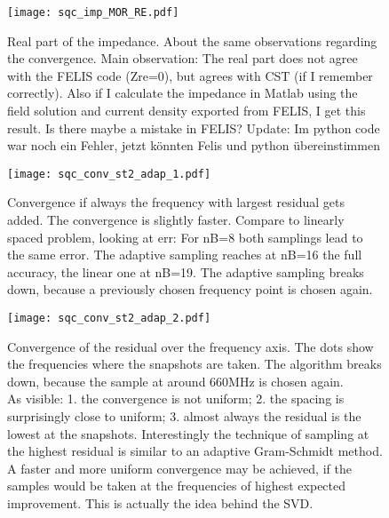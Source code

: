 \begin{figure}[h]
	\centering
	\texttt{[image: sqc\_imp\_MOR\_RE.pdf]}
	\caption{Real part of the impedance. About the same observations regarding the convergence. Main observation: The real part does not agree with the FELIS code (Zre=0), but agrees with CST (if I remember correctly). Also if I calculate the impedance in Matlab using the field solution and current density exported from FELIS, I get this result. Is there maybe a mistake in FELIS? Update: Im python code war noch ein Fehler, jetzt könnten Felis und python übereinstimmen}
	\label{}
\end{figure}

\begin{figure}[h]
	\centering
	\texttt{[image: sqc\_conv\_st2\_adap\_1.pdf]}
	\caption{Convergence if always the frequency with largest residual gets added. The convergence is slightly faster. Compare to linearly spaced problem, looking at err: For nB=8 both samplings lead to the same error. The adaptive sampling reaches at nB=16 the full accuracy, the linear one at nB=19. The adaptive sampling breaks down, because a previously chosen frequency point is chosen again.}
	\label{}
\end{figure}


\begin{figure}[h]
	\centering
	\texttt{[image: sqc\_conv\_st2\_adap\_2.pdf]}
	\caption{Convergence of the residual over the frequency axis. The dots show the frequencies where the snapshots are taken. The algorithm breaks down, because the sample at around 660MHz is chosen again.\\
	As visible: 1. the convergence is not uniform; 2. the spacing is surprisingly close to uniform; 3. almost always the residual is the lowest at the snapshots. Interestingly the technique of sampling at the highest residual is similar to an adaptive Gram-Schmidt method. A faster and more uniform convergence may be achieved, if the samples would be taken at the frequencies of highest expected improvement. This is actually the idea behind the SVD.}
	\label{}
\end{figure}
 
